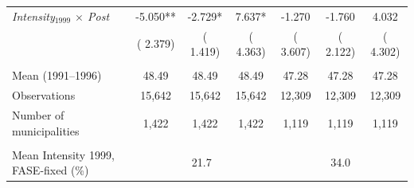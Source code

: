 \begin{tabular}{lcccccc}
\textit{Intensity$_{1999}$ $\times$ Post}&    -5.050**&    -2.729*&     7.637*&    -1.270&    -1.760&     4.032 \\ 
 & (    2.379)& (    1.419)& (    4.363)& (    3.607)& (    2.122)& (    4.302) \\ 
  & & & & & & \\ 
Mean (1991--1996)&     48.49&     48.49&     48.49&     47.28&     47.28&     47.28 \\ 
Observations&     15,642&     15,642&     15,642&     12,309&     12,309&     12,309 \\ 
Number of municipalities&      1,422&      1,422&      1,422&      1,119&      1,119&      1,119 \\ 
  & & & & & & \\ 
Mean Intensity 1999, FASE-fixed (\%) & \multicolumn{3}{c}{  21.7} & \multicolumn{3}{c}{  34.0} \\ 
\bottomrule
\end{tabular}